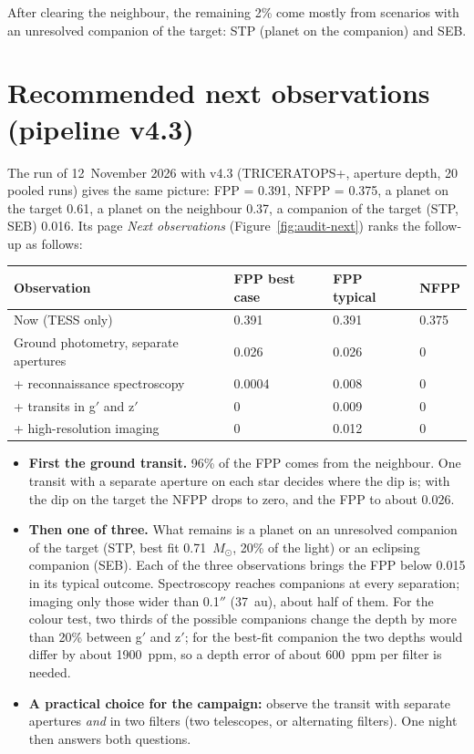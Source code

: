 \documentclass[11pt,a4paper]{report}
\begin{document}
After clearing the neighbour, the remaining 2\% come mostly from
scenarios with an unresolved companion of the target: STP (planet on the
companion) and SEB.

\section*{Recommended next observations (pipeline v4.3)}
The run of 12~November 2026 with v4.3 (TRICERATOPS+, aperture depth, 20
pooled runs) gives the same picture: FPP = 0.391, NFPP = 0.375, a planet on
the target 0.61, a planet on the neighbour 0.37, a companion of the target
(STP, SEB) 0.016. Its page \emph{Next observations}
(Figure~\ref{fig:audit-next}) ranks the follow-up as follows:

\begin{longtable}{@{}p{}p{}p{}p{}@{}}
\toprule
\textbf{Observation} & \textbf{FPP best case} & \textbf{FPP typical} & \textbf{NFPP}\\
\midrule\endhead
Now (TESS only) & 0.391 & 0.391 & 0.375\\
Ground photometry, separate apertures & 0.026 & 0.026 & 0\\
\quad + reconnaissance spectroscopy & 0.0004 & 0.008 & 0\\
\quad + transits in g$'$ and z$'$ & 0 & 0.009 & 0\\
\quad + high-resolution imaging & 0 & 0.012 & 0\\
\bottomrule
\end{longtable}

\begin{itemize}
\item \textbf{First the ground transit.} 96\% of the FPP comes from the
neighbour. One transit with a separate aperture on each star decides where
the dip is; with the dip on the target the NFPP drops to zero, and the FPP to
about 0.026.
\item \textbf{Then one of three.} What remains is a planet on an unresolved
companion of the target (STP, best fit 0.71~$M_\odot$, 20\% of the light) or
an eclipsing companion (SEB). Each of the three observations brings the FPP
below 0.015 in its typical outcome. Spectroscopy reaches companions at every
separation; imaging only those wider than 0.1$''$ (37~au), about half of them.
For the colour test, two thirds of the possible companions change the depth
by more than 20\% between g$'$ and z$'$; for the best-fit companion the two
depths would differ by about 1900~ppm, so a depth error of about 600~ppm per
filter is needed.
\item \textbf{A practical choice for the campaign:} observe the transit with
separate apertures \emph{and} in two filters (two telescopes, or alternating
filters). One night then answers both questions.
\end{itemize}
\end{document}
